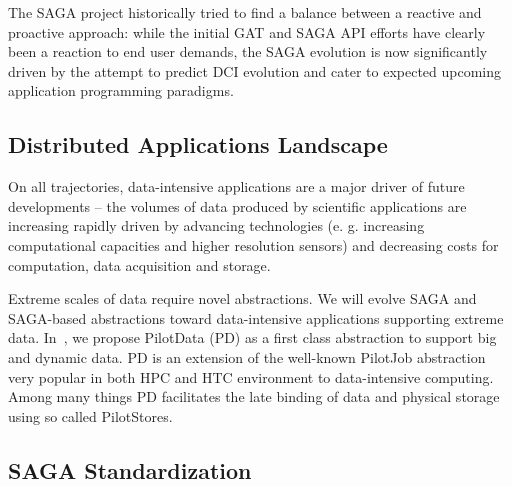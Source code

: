 \documentclass{article}
\newcommand{\I}[1]{\textit{#1}}
\begin{document}
  The SAGA project historically tried to find a balance between
  a reactive and proactive approach: while the initial GAT and SAGA API
  efforts have clearly been a reaction to end user demands, the SAGA
  evolution is now significantly driven by the attempt to predict DCI
  evolution and cater to expected upcoming application programming
  paradigms. 
 

 \subsection{Distributed Applications Landscape}
 
  On all trajectories, data-intensive applications are a major driver of
  future developments -- the volumes of data produced by scientific
  applications are increasing rapidly driven by advancing technologies
  (e. g. increasing computational capacities and higher resolution
  sensors) and decreasing costs for computation, data acquisition and
  storage.

  Extreme scales of data require novel abstractions. We will evolve SAGA
  and SAGA-based abstractions toward data-intensive applications
  supporting extreme data.  In~\cite{troy-2011}, we propose PilotData
  (PD) as a first class abstraction to support big and dynamic data. PD
  is an extension of the well-known PilotJob abstraction very popular in
  both HPC and HTC environment to data-intensive computing.  Among many
  things PD facilitates the late binding of data and physical storage
  using so called PilotStores.

 \subsection{SAGA Standardization}
\end{document}
